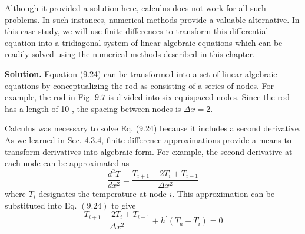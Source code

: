 \documentclass[../main.tex]{subfiles}
\begin{document}
Although it provided a solution here, calculus does not work for all such problems. In such instances, numerical methods provide a valuable alternative. In this case study, we will use finite differences to transform this differential equation into a tridiagonal system of linear algebraic equations which can be readily solved using the numerical methods described in this chapter.

\noindent\textbf{Solution.} Equation (9.24) can be transformed into a set of linear algebraic equations by conceptualizing the rod as consisting of a series of nodes. For example, the rod in Fig. $9.7$ is divided into six equispaced nodes. Since the rod has a length of 10 , the spacing between nodes is $\Delta x=2$.

Calculus was necessary to solve Eq. (9.24) because it includes a second derivative. As we learned in Sec. 4.3.4, finite-difference approximations provide a means to transform derivatives into algebraic form. For example, the second derivative at each node can be approximated as
$$
\frac{d^{2} T}{d x^{2}}=\frac{T_{i+1}-2 T_{i}+T_{i-1}}{\Delta x^{2}}
$$
where $T_{i}$ designates the temperature at node $i$. This approximation can be substituted into Eq. $(9.24)$ to give
$$
\frac{T_{i+1}-2 T_{i}+T_{i-1}}{\Delta x^{2}}+h^{\prime}\left(T_{a}-T_{i}\right)=0
$$
\end{document}
